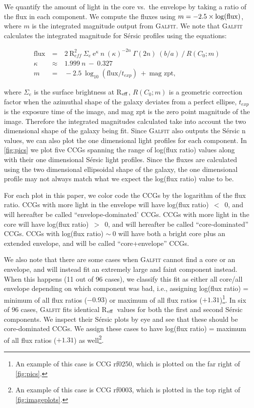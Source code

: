 \documentclass[iop,apj]{emulateapj}
\newcommand{\Reff}{R$_{\rm eff}$}
\begin{document}
We quantify the amount of light in the core vs.~the envelope by taking a ratio of the flux in each component. We compute the fluxes using $m = -2.5 \times \log({\rm flux})$, where $m$ is the integrated magnitude output from \textsc{Galfit}. We note that \textsc{Galfit} calculates the integrated magnitude for S\'ersic profiles using the equations:

\begin{eqnarray}
\text{flux}~&=&~2~\text{R}_{eff}^2~\Sigma_e~\text{e}^{\kappa}~n~(\kappa)^{-2n}~\Gamma(2n)~(b/a)~/~R(C_0; m) \\
\kappa~&\approx&~1.999~n~-~0.327\\
m~&=&~-2.5~\log_{10}(\text{flux}/t_{exp})~+~\text{mag zpt},
\end{eqnarray}

where $\Sigma_e$ is the surface brightness at \Reff, $R(C_0; m)$ is a geometric correction factor when the azimuthal shape of the galaxy deviates from a perfect ellipse, $t_{exp}$ is the exposure time of the image, and mag zpt is the zero point magnitude of the image. Therefore the integrated magnitudes calculated take into account the two dimensional shape of the galaxy being fit. Since \textsc{Galfit} also outputs the S\'ersic n values, we can also plot the one dimensional light profiles for each component. In \autoref{fig:pics} we plot five CCGs spanning the range of log(flux ratio) values along with their one dimensional S\'ersic light profiles. Since the fluxes are calculated using the two dimensional ellipsoidal shape of the galaxy, the one dimensional profile may not always match what we expect the log(flux ratio) value to be.

For each plot in this paper, we color code the CCGs by the logarithm of the flux ratio. CCGs with more light in the envelope will have log(flux ratio)~$<$~0, and will hereafter be called ``envelope-dominated' CCGs. CCGs with more light in the core will have log(flux ratio)~$>$~0, and will hereafter be called ``core-dominated'' CCGs. CCGs with log(flux ratio) $\sim~0$ will have both a bright core plus an extended envelope, and will be called ``core+envelope'' CCGs.

We also note that there are some cases when \textsc{Galfit} cannot find a core or an envelope, and will instead fit an extremely large and faint component instead. When this happens (11 out of 96 cases), we classify this fit as either all core/all envelope depending on which component was bad, i.e., assigning log(flux ratio) = minimum of all flux ratios ($-0.93$) or maximum of all flux ratios ($+1.31$)\footnote{An example of this case is CCG rf0250, which is plotted on the far right of \autoref{fig:pics}.}. In six of 96 cases, \textsc{Galfit} fits identical \Reff\ values for both the first and second S\'ersic components. We inspect their S\'ersic plots by eye and see that these should be core-dominated CCGs. We assign these cases to have log(flux ratio) = maximum of all flux ratios ($+1.31$) as well\footnote{An example of this case is CCG rf0003, which is plotted in the top right of \autoref{fig:imageplots}.}.
\end{document}
